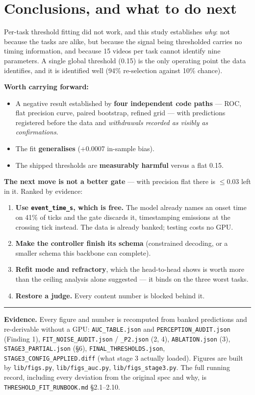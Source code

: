 \documentclass[11pt,a4paper]{article}
\newenvironment{keybox}{\begin{shaded}\noindent}{\end{shaded}}
\begin{document}
\section{Conclusions, and what to do next}

\begin{keybox}
Per-task threshold fitting did not work, and this study establishes \emph{why}: not
because the tasks are alike, but because the signal being thresholded carries no
timing information, and because 15 videos per task cannot identify nine parameters.
A single global threshold (0.15) is the only operating point the data identifies,
and it is identified well (94\% re-selection against 10\% chance).
\end{keybox}

\noindent\textbf{Worth carrying forward:}
\begin{itemize}
\item A negative result established by \textbf{four independent code paths} --- ROC,
flat precision curve, paired bootstrap, refined grid --- with predictions registered
before the data and \emph{withdrawals recorded as visibly as confirmations}.
\item The fit \textbf{generalises} ($+$0.0007 in-sample bias).
\item The shipped thresholds are \textbf{measurably harmful} versus a flat 0.15.
\end{itemize}

\noindent\textbf{The next move is not a better gate} --- with precision flat there is
$\le$0.03 left in it. Ranked by evidence:
\begin{enumerate}
\item \textbf{Use \texttt{event\_time\_s}, which is free.} The model already names an
onset time on 41\% of ticks and the gate discards it, timestamping emissions at the
crossing tick instead. The data is already banked; testing costs no GPU.
\item \textbf{Make the controller finish its schema} (constrained decoding, or a
smaller schema this backbone can complete).
\item \textbf{Refit mode and refractory}, which the head-to-head shows is worth more
than the ceiling analysis alone suggested --- it binds on the three worst tasks.
\item \textbf{Restore a judge.} Every content number is blocked behind it.
\end{enumerate}

\vspace{0.6em}\hrule\vspace{0.5em}
\noindent\small\textbf{Evidence.} Every figure and number is recomputed from banked
predictions and re-derivable without a GPU: \texttt{AUC\_TABLE.json} and
\texttt{PERCEPTION\_AUDIT.json} (Finding 1), \texttt{FIT\_NOISE\_AUDIT.json} /
\texttt{\_P2.json} (2, 4), \texttt{ABLATION.json} (3),
\texttt{STAGE3\_PARTIAL.json} (\S6), \texttt{FINAL\_THRESHOLDS.json},
\texttt{STAGE3\_CONFIG\_APPLIED.diff} (what stage 3 actually loaded).
Figures are built by \texttt{lib/figs.py}, \texttt{lib/figs\_auc.py},
\texttt{lib/figs\_stage3.py}. The full running record, including every deviation
from the original spec and why, is \texttt{THRESHOLD\_FIT\_RUNBOOK.md} \S2.1--2.10.
\end{document}
